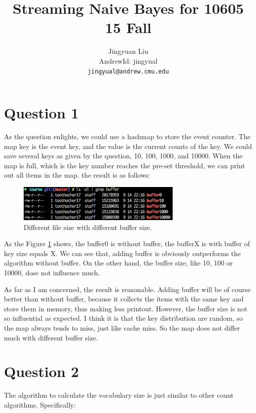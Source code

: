 \documentclass{article} %
\title{Streaming Naive Bayes for 10605 15 Fall}
\author{
Jingyuan Liu\\
AndrewId: jingyual\\
\texttt{jingyual@andrew.cmu.edu} \\
}
\begin{document}
\maketitle


\section{Question 1}
As the question enlights, we could use a hashmap to store the event counter. The
map key is the event key, and the value is the current counts of the key. We
could save several keys as given by the question, 10, 100, 1000, and 10000. When
the map is full, which is the key number reaches the pre-set threshold, we can
print out all items in the map. the result is as follows:\\

\begin{figure}[h]
\begin{center}
\includegraphics[width=80mm]{pic/buffer_result.png}
\end{center}
\caption{Different file size with different buffer size.}
\label{fig:buffer_result}
\end{figure}

As the Figure \ref{fig:buffer_result} shows, the buffer0 is without buffer, the
bufferX is with buffer of key size equals X. We can see that, adding buffer is
obviously outperforms the algorithm without buffer. On the other hand, the
buffer size, like 10, 100 or 10000, dose not influence much.

As far as I am concerned, the result is reasonable. Adding buffer will be of course
better than without buffer, because it collects the items with the same key and
store them in memory, thus making less printout. However, the buffer size is not
so influential as expected. I think it is that the key distribution are random,
so the map always tends to miss, just like cache miss. So the map does not
differ much with different buffer size.


\section{Question 2}
The algorithm to calculate the vocabulary size is just similar to other count
algorithms, Specifically:
\end{document}
